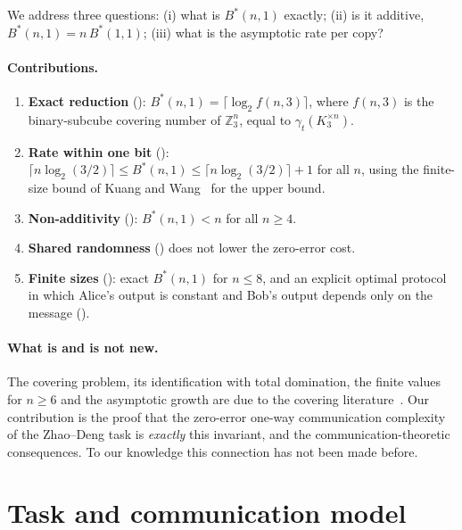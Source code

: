 \documentclass[12pt,a4paper]{article}
\theoremstyle{definition}
\theoremstyle{remark}
\newcommand{\Z}{\mathbb{Z}}
\newcommand{\gammat}{\gamma_t}
\newcommand{\Bstar}{B^{*}}
\begin{document}
We address three questions: (i) what is $\Bstar(n,1)$ exactly; (ii) is it additive, $\Bstar(n,1) = n\,\Bstar(1,1)$; (iii) what is the asymptotic rate per copy?

\paragraph{Contributions.}
\begin{enumerate}[leftmargin=*,itemsep=2pt]
  \item \textbf{Exact reduction} (): $\Bstar(n,1) = \lceil \log_2 f(n,3) \rceil$, where $f(n,3)$ is the binary-subcube covering number of $\Z_3^n$, equal to $\gammat(K_3^{\times n})$.
  \item \textbf{Rate within one bit} (): $\lceil n\log_2(3/2)\rceil \le \Bstar(n,1) \le \lceil n\log_2(3/2)\rceil+1$ for all $n$, using the finite-size bound of Kuang and Wang~\cite{kuangwang2026} for the upper bound.
  \item \textbf{Non-additivity} (): $\Bstar(n,1) < n$ for all $n \ge 4$.
  \item \textbf{Shared randomness} () does not lower the zero-error cost.
  \item \textbf{Finite sizes} (): exact $\Bstar(n,1)$ for $n \le 8$, and an explicit optimal protocol in which Alice's output is constant and Bob's output depends only on the message ().
\end{enumerate}

\paragraph{What is and is not new.} The covering problem, its identification with total domination, the finite values for $n \ge 6$ and the asymptotic growth are due to the covering literature~\cite{adriaensen2026,kuangwang2026}. Our contribution is the proof that the zero-error one-way communication complexity of the Zhao--Deng task is \emph{exactly} this invariant, and the communication-theoretic consequences. To our knowledge this connection has not been made before.

\section{Task and communication model}
\label{sec:task}
\end{document}
